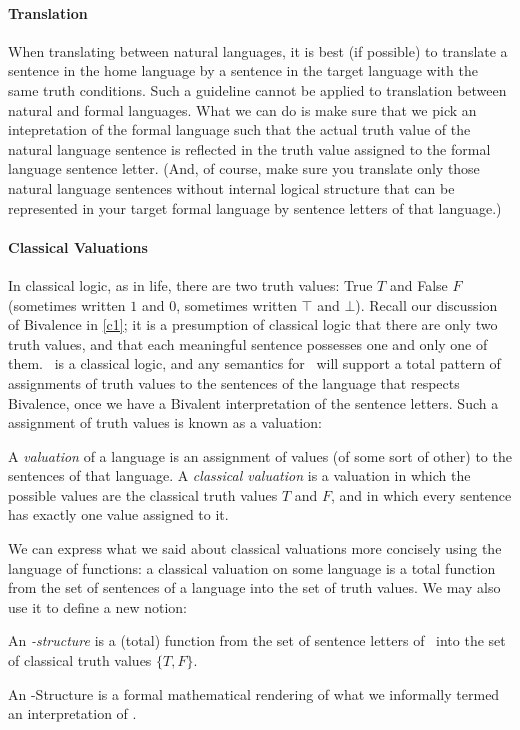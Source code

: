 \paragraph{Translation} When translating between natural languages, it is best (if possible) to translate a sentence in the home language by a sentence in the target language with the same truth conditions. Such a guideline cannot be applied to translation between natural and formal languages. What we can do is make sure that we pick an intepretation of the formal language such that the actual truth value of the natural language sentence is reflected in the truth value assigned to the formal language sentence letter. (And, of course, make sure you translate only those natural language sentences without internal logical structure that can be represented in your target formal language by sentence letters of that language.) 

\paragraph{Classical Valuations} In classical logic, as in life, there are two truth values: True $T$ and False $F$ (sometimes written $1$ and $0$, sometimes written $\top$ and $\bot$). Recall our discussion of Bivalence in \autoref{c1}; it is a presumption of classical logic that there are only two truth values, and that each meaningful sentence possesses one and only one of them. \lone\ is a classical logic, and any semantics for \lone\ will support a total pattern of assignments of truth values to the sentences of the language that respects Bivalence, once we have a Bivalent interpretation of the sentence letters. Such a assignment of truth values is known as a valuation:
\begin{definition}[Valuation]
	A \emph{valuation} of a language is an assignment of values (of some sort of other) to the sentences of that language. A \emph{classical valuation} is a valuation in which the possible values are the classical truth values $T$ and $F$, and in which every sentence has exactly one value assigned to it.
\end{definition}
We can express what we said about classical valuations more concisely using the language of functions: a classical valuation on some language is a total function from the set of sentences of a language into the set of truth values. We may also use it to define a new notion: 
	\begin{definition}
		An \emph{\lone-structure} is a (total) function from the set of sentence letters of \lone\ into the set of classical truth values $\{T,F\}$.
	\end{definition} An \lone-Structure is a formal mathematical rendering of what we informally termed an interpretation of \lone.

